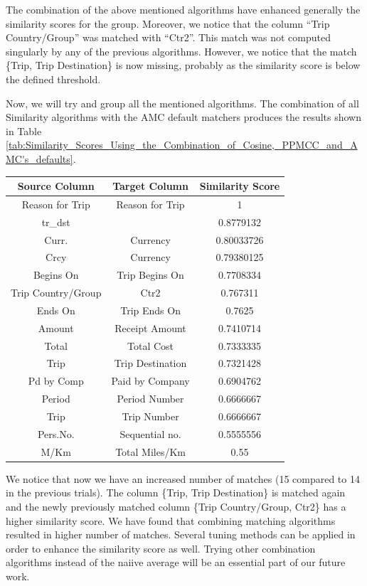 \documentclass{../../Util/LaTEX/sig-alternate}
\begin{document}
The combination of the above mentioned algorithms have enhanced generally the similarity scores for the group. Moreover, we notice that the column ``Trip Country/Group'' was matched with ``Ctr2''. This match was not computed singularly by any of the previous algorithms. However, we notice that the match \{Trip, Trip Destination\} is now missing, probably as the similarity score is below the defined threshold.

Now, we will try and group all the mentioned algorithms. The combination of all Similarity algorithms with the AMC default matchers produces the results shown in Table \ref{tab:Similarity_Scores_Using_the_Combination_of_Cosine,_PPMCC_and_AMC's_defaults}.

\begin{table}[ht]
\centering
\begin{tabular}{|c|c|c|} \hline
\textbf{Source Column} & \textbf{Target Column} & \textbf{Similarity Score} \\ \hline
Reason for Trip & Reason for Trip & 1 \\ \hline
tr\_dst &  & 0.8779132 \\ \hline
Curr. & Currency & 0.80033726 \\ \hline
Crcy & Currency & 0.79380125 \\ \hline
Begins On & Trip Begins On & 0.7708334 \\ \hline
Trip Country/Group & Ctr2 & 0.767311 \\ \hline
Ends On & Trip Ends On & 0.7625 \\ \hline
Amount & Receipt Amount & 0.7410714 \\ \hline
Total & Total Cost & 0.7333335 \\ \hline
Trip & Trip Destination & 0.7321428 \\ \hline
Pd by Comp & Paid by Company & 0.6904762 \\ \hline
Period & Period Number & 0.6666667 \\ \hline
Trip & Trip Number & 0.6666667 \\ \hline
Pers.No. & Sequential no. & 0.5555556 \\ \hline
M/Km & Total Miles/Km & 0.55 \\ \hline
\end{tabular}
\end{table}

We notice that now we have an increased number of matches (15 compared to 14 in the previous trials). The column \{Trip, Trip Destination\} is matched again and the newly previously matched column \{Trip Country/Group, Ctr2\} has a higher similarity score. We have found that combining matching algorithms resulted in higher number of matches. Several tuning methods can be applied in order to enhance the similarity score as well. Trying other combination algorithms instead of the naiive average will be an essential part of our future work. \\ \\
\end{document}
